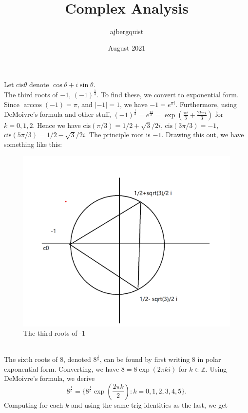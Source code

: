 \documentclass{article}
\title{Complex Analysis}
\author{ajbergquist }
\date{August 2021}
\theoremstyle{definition}
\newcommand{\cis}{\mbox{cis}}
\newcommand{\Z}{\mathbb{Z}}
\newcommand{\cs}[1]{\color{blue}{#1}\normalcolor}
\begin{document}
 Let $\cis\theta$ denote $\cos\theta + i\sin\theta$.\\
 The third roots of $-1$, $(-1)^{\frac{1}{3}}$. To find these, we convert to exponential form. Since $\arccos(-1) = \pi$, \cs{The arccos command has two cs.} and $|-1| = 1$, we have $-1 = e^{\pi i}.$ Furthermore, using DeMoivre's formula and other stuff, $(-1)^{\frac{1}{3}} = e^{\frac{\pi i}{3}} = \exp(\frac{\pi i}{3} + \frac{2k\pi i}{3})$ for $k = 0,1,2$. Hence we have $\cis(\pi/3) = 1/2 + \sqrt{3}/2 i$, $\cis(3\pi/3) = -1$, $\cis(5\pi/3) = 1/2 - \sqrt{3}/2 i.$ The principle root is $-1$. \cs{The principle root is the one that uses $k=0.$} Drawing this out, we have something like this:
\begin{figure}[htbp]
\centerline{\includegraphics[scale=0.5]{roots-1.png}}
\caption{The third roots of -1}
\label{fig}
\end{figure}\\
 The sixth roots of $8$, denoted $8^{\frac{1}{8}}$, can be found by first writing $8$ in polar exponential form. Converting, we have $8 = 8\exp(2\pi k i)$ for $k\in \Z$. Using DeMoivre's formula, we derive $$8^{\frac{1}{6}} = \{8^{\frac{1}{6}}\exp(\frac{2\pi k}{2}):k = 0,1,2,3,4,5\}.$$ \cs{$\exp(2\pi ki/6)$?} Computing for each $k$ and using the same trig identities as the last, we get $ $
\end{document}

